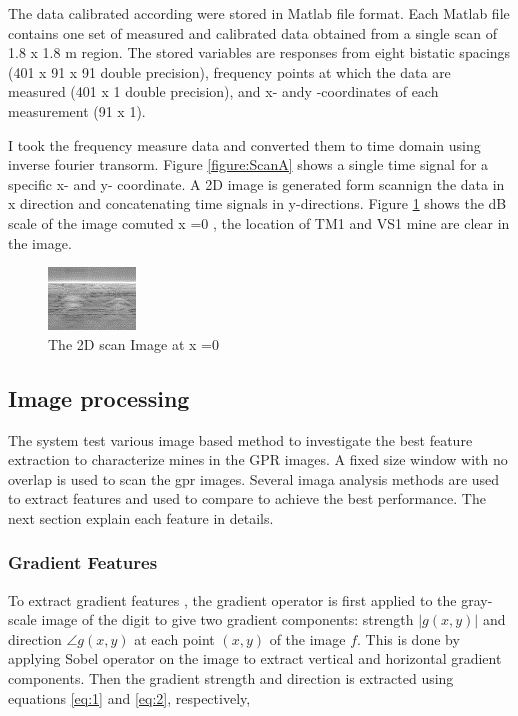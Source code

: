 \documentclass[conference]{IEEEtran}
\begin{document}
The data calibrated according were stored in Matlab file format. Each Matlab file contains one set of measured and calibrated data obtained from a single scan of 1.8 x 1.8 m region. The stored variables are responses from eight bistatic spacings (401 x 91 x 91 double precision), frequency points at which the data are measured (401 x 1 double precision), and x- andy -coordinates of each measurement (91 x 1).



I took the frequency measure data and converted them to time domain using inverse fourier transorm. Figure \ref{figure:ScanA} shows a single time signal for a specific x- and y- coordinate. A 2D image is generated form scannign the data in x direction and concatenating time signals in y-directions. Figure \ref{fig:mineAtx0} shows the dB scale of the image comuted x =0 , the location of TM1 and VS1 mine are clear in the image. %








 \begin{figure}
\centering
\label{fig:mineAtx0}
\includegraphics[scale=1.5]{images/MineCleanX0.jpg}
 \caption{The 2D scan Image at x =0 }
\end{figure}

\subsection{Image processing}
\label{sec:image}

The system test various image based method to investigate the best feature extraction to characterize mines in the GPR images. A fixed size window with no overlap is used to scan the gpr images. Several imaga analysis methods are used to extract features and used to compare to achieve the best performance. The next section explain each feature in details.

\subsubsection {Gradient Features}
\label{sec:grad}
To extract gradient features \cite{Liu2003}, the gradient operator is first applied to the gray-scale image of the digit to give two gradient components: strength $|g(x,y)|$ and direction $\angle g(x,y)$ at each point $(x,y)$ of the image $f$. This is done by applying Sobel operator \cite{gonzales2002} on the image to extract vertical and horizontal gradient components. Then the gradient strength and direction is extracted using equations \ref{eq:1} and  \ref{eq:2}, respectively,
\end{document}
